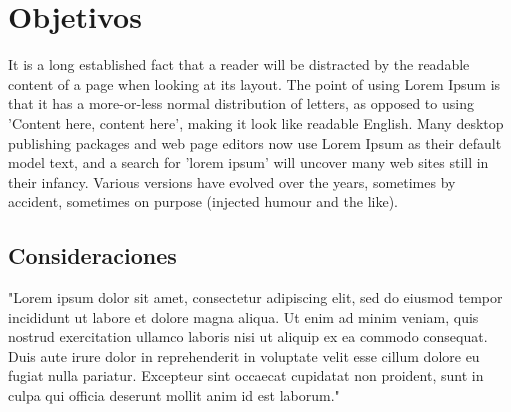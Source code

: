 \documentclass[a4paper]{article}
\begin{document}
\section{Objetivos}
  It is a long established fact that a reader will be distracted by the readable content of a page when looking at its layout. The point of using Lorem Ipsum is that it has a more-or-less normal distribution of letters, as opposed to using 'Content here, content here', making it look like readable English. Many desktop publishing packages and web page editors now use Lorem Ipsum as their default model text, and a search for 'lorem ipsum' will uncover many web sites still in their infancy. Various versions have evolved over the years, sometimes by accident, sometimes on purpose (injected humour and the like).
\subsection{Consideraciones}
"Lorem ipsum dolor sit amet, consectetur adipiscing elit, sed do eiusmod tempor incididunt ut labore et dolore magna aliqua. Ut enim ad minim veniam, quis nostrud exercitation ullamco laboris nisi ut aliquip ex ea commodo consequat. Duis aute irure dolor in reprehenderit in voluptate velit esse cillum dolore eu fugiat nulla pariatur. Excepteur sint occaecat cupidatat non proident, sunt in culpa qui officia deserunt mollit anim id est laborum."
\end{document}
